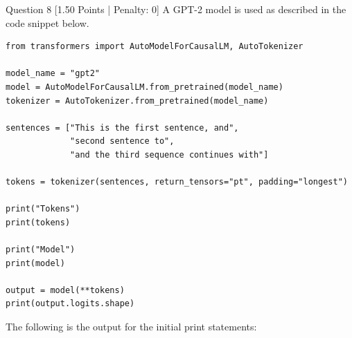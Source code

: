 \documentclass[11pt,a4paper]{article}
\begin{document}
\newpage

\begin{questionbox}{Question 8 \hfill [1.50 Points | Penalty: 0]}
A GPT-2 model is used as described in the code snippet below.

\begin{lstlisting}[style=pythonstyle]
from transformers import AutoModelForCausalLM, AutoTokenizer

model_name = "gpt2"
model = AutoModelForCausalLM.from_pretrained(model_name)
tokenizer = AutoTokenizer.from_pretrained(model_name)

sentences = ["This is the first sentence, and",
             "second sentence to",
             "and the third sequence continues with"]

tokens = tokenizer(sentences, return_tensors="pt", padding="longest")

print("Tokens")
print(tokens)

print("Model")
print(model)

output = model(**tokens)
print(output.logits.shape)
\end{lstlisting}

\noindent
The following is the output for the initial print statements:


\end{questionbox}
\end{document}
